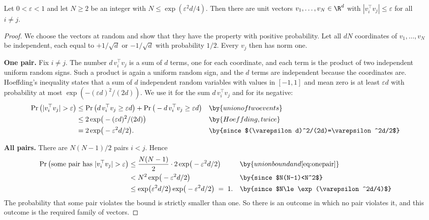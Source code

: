 \begin{proposition}\label{prop:jl}
Let $0<\varepsilon<1$ and let $N\ge 2$ be an integer with $N\le\exp(\varepsilon^2d/4)$. Then there are unit
vectors $v_1,\dots,v_N\in\R^d$ with $|v_i^\top v_j|\le\varepsilon$ for all $i\ne j$.
\end{proposition}
\begin{proof}
We choose the vectors at random and show that they have the property with positive probability. Let all $dN$
coordinates of $v_1,\dots,v_N$ be independent, each equal to $+1/\sqrt d$ or $-1/\sqrt d$ with probability $1/2$.
Every $v_j$ then has norm one.

\textbf{One pair.} Fix $i\ne j$. The number $d\,v_i^\top v_j$ is a sum of $d$ terms, one for each coordinate, and
each term is the product of two independent uniform random signs. Such a product is again a uniform random
sign, and the $d$ terms are independent because the coordinates are. Hoeffding's inequality
\citep[Theorem 2]{hoeffding1963probability} states that a sum of $d$ independent random variables with values in
$[-1,1]$ and mean zero is at least $\varepsilon d$ with probability at most $\exp(-(\varepsilon d)^2/(2d))$. We
use it for the sum $d\,v_i^\top v_j$ and for its negative:
\begin{align}
\Pr\big(|v_i^\top v_j|>\varepsilon\big)
&\le \Pr\big(d\,v_i^\top v_j\ge\varepsilon d\big)+\Pr\big(-d\,v_i^\top v_j\ge\varepsilon d\big) && \by{union of two events}\notag\\
&\le 2\exp\!\big(-(\varepsilon d)^2/(2d)\big) && \by{Hoeffding, twice}\notag\\
&= 2\exp\!\big(-\varepsilon^2d/2\big). && \by{since $(\varepsilon d)^2/(2d)=\varepsilon^2d/2$} \label{eq:onepair}
\end{align}

\textbf{All pairs.} There are $N(N-1)/2$ pairs $i<j$. Hence
\begin{align*}
\Pr\big(\text{some pair has }|v_i^\top v_j|>\varepsilon\big)
&\le \frac{N(N-1)}{2}\cdot 2\exp\!\big(-\varepsilon^2d/2\big) && \by{union bound and \eqref{eq:onepair}}\\
&< N^2\exp\!\big(-\varepsilon^2d/2\big) && \by{since $N(N-1)<N^2$}\\
&\le \exp\!\big(\varepsilon^2d/2\big)\exp\!\big(-\varepsilon^2d/2\big) \;=\; 1. && \by{since $N\le\exp(\varepsilon^2d/4)$}
\end{align*}
The probability that some pair violates the bound is strictly smaller than one. So there is an outcome in
which no pair violates it, and this outcome is the required family of vectors.
\end{proof}

